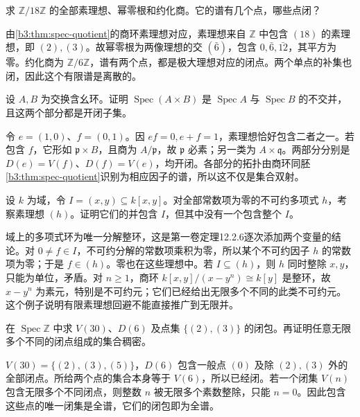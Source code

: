 \begin{exercise}\label{b3:ex:01-integer-radical}
	求 \(\mathbb Z/18\mathbb Z\) 的全部素理想、幂零根和约化商。它的谱有几个点，哪些点闭？
\end{exercise}
\begin{solution}
	由\cref{b3:thm:spec-quotient}的商环素理想对应，素理想来自 \(\mathbb Z\) 中包含 \((18)\) 的素理想，即 \((2),(3)\)。故幂零根为两像理想的交 \((\bar6)\)，包含 \(0,\bar6,\bar{12}\)，其平方为零。约化商为 \(\mathbb Z/6\mathbb Z\)，谱有两个点，都是极大理想对应的闭点。两个单点的补集也闭，因此这个有限谱是离散的。
\end{solution}

\begin{exercise}\label{b3:ex:01-product-spectrum}
	设 \(A,B\) 为交换含幺环。证明 \(\operatorname{Spec}(A\times B)\) 是 \(\operatorname{Spec}A\) 与 \(\operatorname{Spec}B\) 的不交并，且这两个部分都是开闭子集。
\end{exercise}
\begin{solution}
	令 \(e=(1,0)\)、\(f=(0,1)\)。因 \(ef=0,e+f=1\)，素理想恰好包含二者之一。若包含 \(f\)，它形如 \(\mathfrak p\times B\)，且商为 \(A/\mathfrak p\)，故 \(\mathfrak p\) 必素；另一类为 \(A\times\mathfrak q\)。两部分分别是 \(D(e)=V(f)\)、\(D(f)=V(e)\)，均开闭。各部分的拓扑由商环同胚\cref{b3:thm:spec-quotient}识别为相应因子的谱，所以这不仅是集合双射。
\end{solution}

\begin{exercise}\label{b3:ex:01-infinite-prime-avoidance}
	设 \(k\) 为域，令 \(I=(x,y)\subseteq k[x,y]\)。对全部常数项为零的不可约多项式 \(h\)，考察素理想 \((h)\)。证明它们的并包含 \(I\)，但其中没有一个包含整个 \(I\)。
\end{exercise}
\begin{solution}
	域上的多项式环为唯一分解整环，这是第一卷定理12.2.6逐次添加两个变量的结论。对 \(0\ne f\in I\)，不可约分解的常数项乘积为零，所以某个不可约因子 \(h\) 的常数项为零；于是 \(f\in(h)\)。零也在这些理想中。若 \(I\subseteq(h)\)，则 \(h\) 同时整除 \(x,y\)，只能为单位，矛盾。对 \(n\ge1\)，商环 \(k[x,y]/(x-y^n)\cong k[y]\) 是整环，故 \(x-y^n\) 为素元，特别是不可约元；它们已经给出无限多个不同的此类不可约元。这个例子说明有限素理想回避不能直接推广到无限并。
\end{solution}

\begin{exercise}\label{b3:ex:01-closed-integers}
	在 \(\operatorname{Spec}\mathbb Z\) 中求 \(V(30)\)、\(D(6)\) 及点集 \(\bigl\{(2),(3)\bigr\}\) 的闭包。再证明任意无限多个不同的闭点组成的集合稠密。
\end{exercise}
\begin{solution}
	\(V(30)=\bigl\{(2),(3),(5)\bigr\}\)，\(D(6)\) 包含一般点 \((0)\) 及除 \((2),(3)\) 外的全部闭点。所给两个点的集合本身等于 \(V(6)\)，所以已经闭。若一个闭集 \(V(n)\) 包含无限多个不同闭点，则整数 \(n\) 被无限多个素数整除，只能 \(n=0\)。因此包含这些点的唯一闭集是全谱，它们的闭包即为全谱。
\end{solution}

